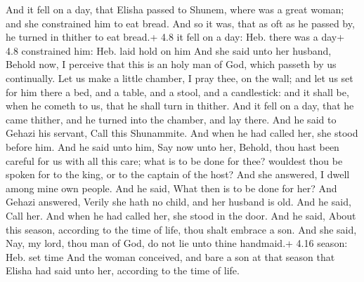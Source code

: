  And it fell on a day, that Elisha passed to Shunem, where
was a great woman; and she constrained him to eat bread. And so it was,
that as oft as he passed by, he turned in thither to eat bread.+ 4.8 it
fell on a day: Heb. there was a day+ 4.8 constrained him: Heb. laid hold
on him  And she said unto her husband, Behold now, I
perceive that this is an holy man of God, which passeth by us
continually.  Let us make a little chamber, I pray thee, on
the wall; and let us set for him there a bed, and a table, and a stool,
and a candlestick: and it shall be, when he cometh to us, that he shall
turn in thither.  And it fell on a day, that he came
thither, and he turned into the chamber, and lay there. 
And he said to Gehazi his servant, Call this Shunammite. And when he had
called her, she stood before him.  And he said unto him,
Say now unto her, Behold, thou hast been careful for us with all this
care; what is to be done for thee? wouldest thou be spoken for to the
king, or to the captain of the host? And she answered, I dwell among
mine own people.  And he said, What then is to be done for
her? And Gehazi answered, Verily she hath no child, and her husband is
old.  And he said, Call her. And when he had called her,
she stood in the door.  And he said, About this season,
according to the time of life, thou shalt embrace a son. And she said,
Nay, my lord, thou man of God, do not lie unto thine handmaid.+ 4.16
season: Heb. set time  And the woman conceived, and bare a
son at that season that Elisha had said unto her, according to the time
of life.

